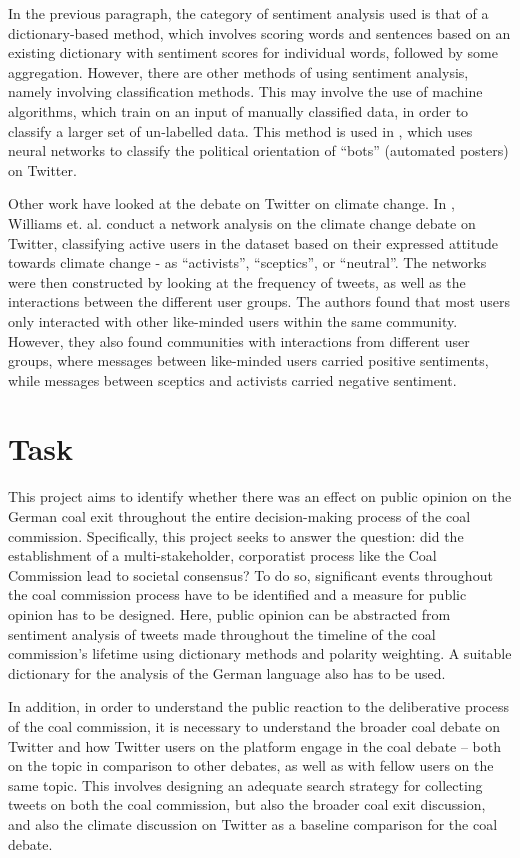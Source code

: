 \documentclass[12pt,onecolumn,twoside]{layout}
\begin{document}
In the previous paragraph, the category of sentiment analysis used is that of a dictionary-based method, which involves scoring words and sentences based on an existing dictionary with sentiment scores for individual words, followed by some aggregation. However, there are other methods of using sentiment analysis, namely involving classification methods. This may involve the use of machine algorithms, which train on an input of manually classified data, in order to classify a larger set of un-labelled data. This method is used in \cite{Stukal2019}, which uses neural networks to classify the political orientation of ``bots'' (automated posters) on Twitter. 

Other work have looked at the debate on Twitter on climate change. In \cite{Williams2015}, Williams et. al. conduct a network analysis on the climate change debate on Twitter, classifying active users in the dataset based on their expressed attitude towards climate change - as ``activists'', ``sceptics'', or ``neutral''. The networks were then constructed by looking at the frequency of tweets, as well as the interactions between the different user groups. The authors found that most users only interacted with other like-minded users within the same community. However, they also found communities with interactions from different user groups, where messages between like-minded users carried positive sentiments, while messages between sceptics and activists carried negative sentiment.

\section*{Task} \label{sec:task}
This project aims to identify whether there was an effect on public opinion on the German coal exit throughout the entire decision-making process of the coal commission. Specifically, this project seeks to answer the question: did the establishment of a multi-stakeholder, corporatist process like the Coal Commission lead to societal consensus? To do so, significant events throughout the coal commission process have to be identified and a measure for public opinion has to be designed. Here, public opinion can be abstracted from sentiment analysis of tweets made throughout the timeline of the coal commission's lifetime using dictionary methods and polarity weighting. A suitable dictionary for the analysis of the German language also has to be used. 

In addition, in order to understand the public reaction to the deliberative process of the coal commission, it is necessary to understand the broader coal debate on Twitter and how Twitter users on the platform engage in the coal debate -- both on the topic in comparison to other debates, as well as with fellow users on the same topic. This involves designing an adequate search strategy for collecting tweets on both the coal commission, but also the broader coal exit discussion, and also the climate discussion on Twitter as a baseline comparison for the coal debate. 
\end{document}
